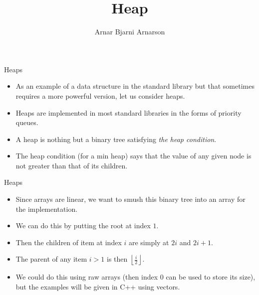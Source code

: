 \documentclass{beamer}
\title{Heap}
\author{Arnar Bjarni Arnarson}
\institute{\href{http://ru.is/td}{School of Computer Science} \\[2pt] \href{http://ru.is}{Reykjavík University}}
\newcommand\floor[1]{\left\lfloor#1\right\rfloor}
\begin{document}
\maketitle

\begin{frame}[plain]{Heaps}
    \begin{itemize}
        \item<1-> As an example of a data structure in the standard library but that sometimes requires a more powerful version, let us consider heaps.
        \item<2-> Heaps are implemented in most standard libraries in the forms of priority queues.
        \item<3-> A heap is nothing but a binary tree satisfying \textit{the heap condition}.
        \item<4-> The heap condition (for a min heap) says that the value of any given node is not greater than that of its children.
    \end{itemize}
\end{frame}

\begin{frame}[plain]{Heaps}
    \begin{itemize}
        \item<1-> Since arrays are linear, we want to smush this binary tree into an array for the implementation.
        \item<2-> We can do this by putting the root at index $1$.
        \item<2-> Then the children of item at index $i$ are simply at $2i$ and $2i+1$.
        \item<2-> The parent of any item $i > 1$ is then $\floor{\frac{i}{2}}$.
        \item<3-> We could do this using raw arrays (then index $0$ can be used to store its size), but the examples will be given in C++ using vectors.
    \end{itemize}
\end{frame}
\end{document}

